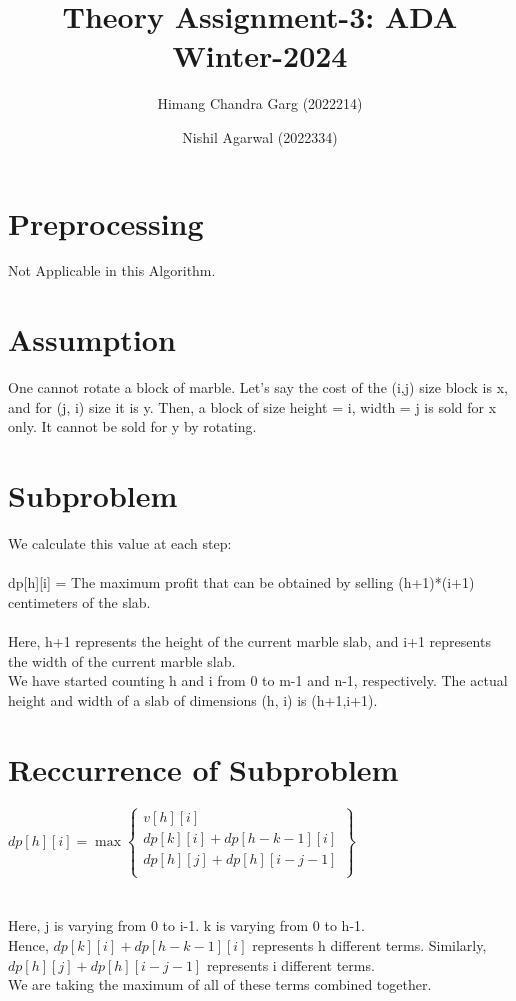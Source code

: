 \documentclass{article}
\title{Theory Assignment-3: ADA Winter-2024}
\author{Himang Chandra Garg (2022214) \and Nishil Agarwal (2022334)}
\date{}
\begin{document}
\maketitle

\section{Preprocessing}
Not Applicable in this Algorithm.


\section{Assumption}
One cannot rotate a block of marble. Let's say the cost of the (i,j) size block is x, and for (j, i) size it is y. Then, a block of size height = i, width = j is sold for x only. It cannot be sold for y by rotating.


\section{Subproblem}
We calculate this value at each step:\\\\
dp[h][i] = The maximum profit that can be obtained by selling (h+1)*(i+1) centimeters of the slab.
\\\\
Here, h+1 represents the height of the current marble slab, and i+1 represents the width of the current marble slab.
\\
We have started counting h and i from 0 to m-1 and n-1, respectively. The actual height and width of a slab of dimensions (h, i) is (h+1,i+1).


\section{Reccurrence of Subproblem }
$dp[h][i] = \max \left\{
\begin{array}{ll}
v[h][i]\\
dp[k][i]+dp[h - k - 1][i]\\
dp[h][j]+dp[h][i - j - 1]\\
\end{array}
\right\}$
\\\\\\
Here, j is varying from 0 to i-1. k is varying from 0 to h-1.\\
Hence, $dp[k][i]+dp[h - k - 1][i]$ represents h different terms. Similarly, $dp[h][j]+dp[h][i - j - 1]$ represents i different terms.\\
We are taking the maximum of all of these terms combined together.
\end{document}
